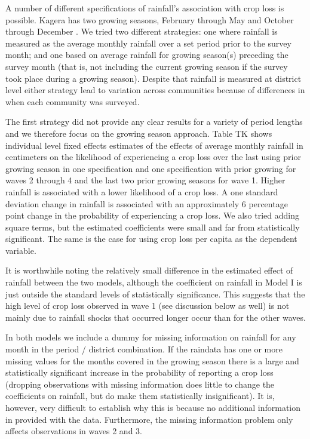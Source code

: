 \documentclass[letterpaper,12pt]{article}
\begin{document}
\begin{enumerate}
A number of different specifications of rainfall's association with 
crop loss is possible.
Kagera has two growing seasons, February through May and
October through December \citet[p 6]{Tanzania2007}.
We tried two different strategies: 
one where rainfall is measured as the average monthly rainfall 
over a set period prior to the survey month; 
and one based on average rainfall for growing season(s) preceding 
the survey month 
(that is, not including the current growing season if the survey
took place during a growing season).
Despite that rainfall is measured at district level either strategy
lead to variation across communities because of differences in 
when each community was surveyed.

The first strategy did not provide any clear results for a variety
of period lengths and we therefore focus on the growing season approach.
Table TK shows individual level fixed effects estimates of the 
effects of average monthly rainfall in centimeters on the likelihood
of experiencing a crop loss over the last using prior growing season 
in one specification and one specification with prior growing for
waves 2 through 4 and the last two prior growing seasons for wave 1.
Higher rainfall is associated with a lower likelihood of a crop loss. 
A one standard deviation change in rainfall is associated with an
approximately 6 percentage point change in the probability of 
experiencing a crop loss.
We also tried adding square terms, but the estimated coefficients
were small and far from statistically significant.
The same is the case for using crop loss per capita as the dependent
variable. 

It is worthwhile noting the relatively small difference in the 
estimated effect of rainfall between the two models, 
although the coefficient on rainfall in Model I is just outside
the standard levels of statistically significance.
This suggests that the high level of crop loss observed in
wave 1 (see discussion below as well) is not mainly due to 
rainfall shocks that occurred longer occur than for the other waves.

In both models we include a dummy for missing information on rainfall 
for any month in the period / district combination.
If the raindata has one or more missing values for the months
covered in the growing season there is a large and statistically 
significant increase in the probability of reporting a crop loss
(dropping observations with missing information does little
to change the coefficients on rainfall, but do make them
statistically insignificant).
It is, however, very difficult to establish why this is because
no additional information in provided with the data.
Furthermore, the missing information problem only affects
observations in waves 2 and 3.


\end{enumerate}
\end{document}
